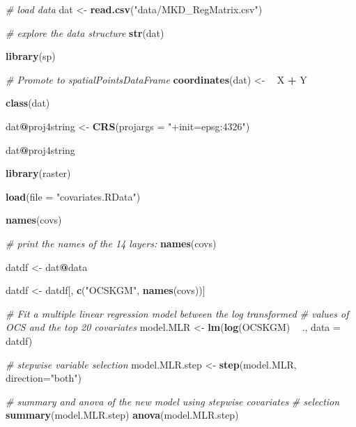 \documentclass[10pt,b5paper,]{book}
\newenvironment{Shaded}{\begin{snugshade}}{\end{snugshade}}
\newcommand{\CommentTok}[1]{\textcolor[rgb]{0.56,0.35,0.01}{\textit{#1}}}
\newcommand{\DataTypeTok}[1]{\textcolor[rgb]{0.13,0.29,0.53}{#1}}
\newcommand{\ErrorTok}[1]{\textcolor[rgb]{0.64,0.00,0.00}{\textbf{#1}}}
\newcommand{\KeywordTok}[1]{\textcolor[rgb]{0.13,0.29,0.53}{\textbf{#1}}}
\newcommand{\NormalTok}[1]{#1}
\newcommand{\OperatorTok}[1]{\textcolor[rgb]{0.81,0.36,0.00}{\textbf{#1}}}
\newcommand{\StringTok}[1]{\textcolor[rgb]{0.31,0.60,0.02}{#1}}
\theoremstyle{definition}
\theoremstyle{definition}
\theoremstyle{definition}
\theoremstyle{remark}
\begin{document}
\begin{Shaded}
\begin{Highlighting}[]
\CommentTok{# load data}
\NormalTok{dat <-}\StringTok{ }\KeywordTok{read.csv}\NormalTok{(}\StringTok{"data/MKD_RegMatrix.csv"}\NormalTok{)}

\CommentTok{# explore the data structure}
\KeywordTok{str}\NormalTok{(dat)}

\KeywordTok{library}\NormalTok{(sp)}

\CommentTok{# Promote to spatialPointsDataFrame}
\KeywordTok{coordinates}\NormalTok{(dat) <-}\StringTok{ }\ErrorTok{~}\StringTok{ }\NormalTok{X }\OperatorTok{+}\StringTok{ }\NormalTok{Y}

\KeywordTok{class}\NormalTok{(dat)}

\NormalTok{dat}\OperatorTok{@}\NormalTok{proj4string <-}\StringTok{ }\KeywordTok{CRS}\NormalTok{(}\DataTypeTok{projargs =} \StringTok{"+init=epsg:4326"}\NormalTok{)}

\NormalTok{dat}\OperatorTok{@}\NormalTok{proj4string}

\KeywordTok{library}\NormalTok{(raster)}

\KeywordTok{load}\NormalTok{(}\DataTypeTok{file =} \StringTok{"covariates.RData"}\NormalTok{)}

\KeywordTok{names}\NormalTok{(covs)}

\CommentTok{# print the names of the 14 layers:}
\KeywordTok{names}\NormalTok{(covs)}

\NormalTok{datdf <-}\StringTok{ }\NormalTok{dat}\OperatorTok{@}\NormalTok{data}

\NormalTok{datdf <-}\StringTok{ }\NormalTok{datdf[, }\KeywordTok{c}\NormalTok{(}\StringTok{"OCSKGM"}\NormalTok{, }\KeywordTok{names}\NormalTok{(covs))]}

\CommentTok{# Fit a multiple linear regression model between the log transformed}
\CommentTok{# values of OCS and the top 20 covariates}
\NormalTok{model.MLR <-}\StringTok{ }\KeywordTok{lm}\NormalTok{(}\KeywordTok{log}\NormalTok{(OCSKGM) }\OperatorTok{~}\StringTok{ }\NormalTok{., }\DataTypeTok{data =}\NormalTok{ datdf)}

\CommentTok{# stepwise variable selection}
\NormalTok{model.MLR.step <-}\StringTok{ }\KeywordTok{step}\NormalTok{(model.MLR, }\DataTypeTok{direction=}\StringTok{"both"}\NormalTok{)}

\CommentTok{# summary and anova of the new model using stepwise covariates}
\CommentTok{# selection}
\KeywordTok{summary}\NormalTok{(model.MLR.step)}
\KeywordTok{anova}\NormalTok{(model.MLR.step)}


\end{Highlighting}
\end{Shaded}
\end{document}
